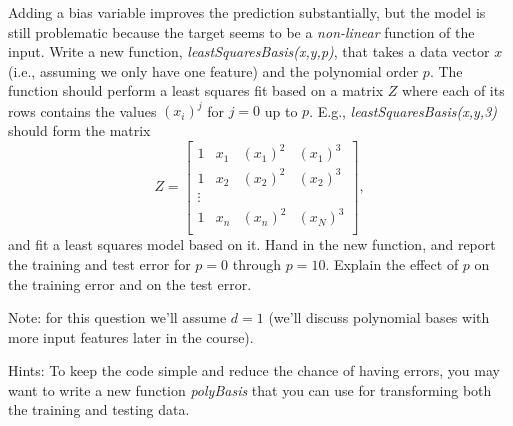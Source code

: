 \documentclass{article}
\def\blu#1{{\color{blu}#1}}
\begin{document}
Adding a bias variable improves the prediction substantially, but the model is still problematic because the target seems to be a \emph{non-linear} function of the input. Write a new function, \emph{leastSquaresBasis(x,y,p)}, that takes a data vector $x$ (i.e., assuming we only have one feature) and the polynomial order $p$. The function should perform a least squares fit based on a matrix $Z$ where each of its rows contains the values $(x_{i})^j$ for $j=0$ up to $p$. E.g., \emph{leastSquaresBasis(x,y,3)} should form the matrix
\[
Z = 
\left[\begin{array}{cccc}
1 & x_1 & (x_1)^2 & (x_1)^3\\
1 & x_2 & (x_2)^2 & (x_2)^3\\
\vdots\\
1 & x_n & (x_n)^2 & (x_N)^3\\
\end{array}
\right],
\]
and fit a least squares model based on it.
\blu{Hand in the new function, and report the training and test error for $p = 0$ through $p= 10$. Explain the effect of $p$ on the training error and on the test error.}

Note: for this question we'll assume $d=1$ (we'll discuss polynomial bases with more input features later in the course).

Hints: To keep the code simple and reduce the chance of having errors, you may want to write a new function \emph{polyBasis} that you can use for transforming both the training and testing data. 
\end{document}
